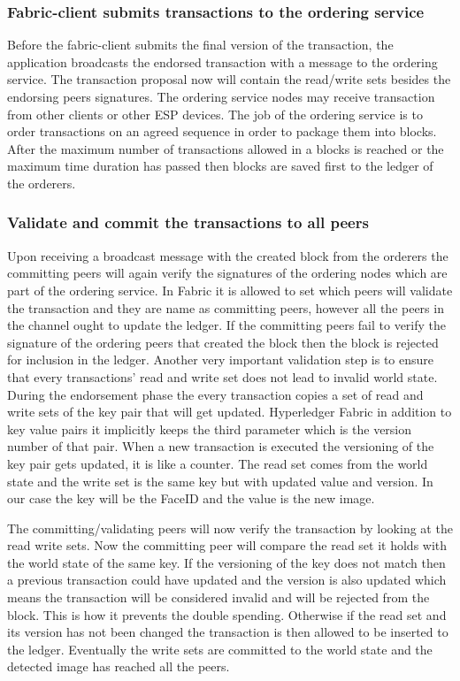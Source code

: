 \subsubsection{Fabric-client submits transactions to the ordering service}

Before the fabric-client submits the final version of the transaction, the application broadcasts the endorsed transaction with a message to the ordering service.
The transaction proposal now will contain the read/write sets besides the endorsing peers signatures. 
The ordering service nodes may receive transaction from other clients or other ESP devices. The job of the ordering service is to order transactions on an agreed sequence in order to package them into blocks. After the maximum number of transactions allowed in a blocks is reached or the maximum time duration has passed then blocks are saved first to the ledger of the orderers. 


\subsubsection{Validate and commit the transactions to all peers}

Upon receiving a broadcast message with the created block from the orderers the committing peers will again verify the signatures of the ordering nodes which are part of the ordering service. In Fabric it is allowed to set which peers will validate the transaction and they are name as committing peers, however all the peers in the channel ought to update the ledger.
If the committing peers fail to verify the signature of the ordering peers that created the block then the block is rejected for inclusion in the ledger. Another very important validation step is to ensure that every transactions' read and write set does not lead to invalid world state. During the endorsement phase the every transaction copies a set of read and write sets of the key pair that will get updated. Hyperledger Fabric in addition to key value pairs it implicitly keeps the third parameter which is the version number of that pair. When a new transaction is executed the versioning  of the key pair gets updated, it is like a counter. The read set comes from the world state and the write set is the same key but with updated value and version. In our case the key will be the FaceID and the value is the new image.

The committing/validating peers will now verify the transaction by looking at the read write sets. Now the committing peer will compare the read set it holds with the world state of the same key. If the versioning of the key does not match then a previous transaction could have updated and the version is also updated which means the transaction will be considered invalid and will be rejected from the block. This is how it prevents the double spending. Otherwise if the read set and its version has not been changed the transaction is then allowed to be inserted to the ledger. Eventually the write sets are committed to the world state and the detected image has reached all the peers. 
 
